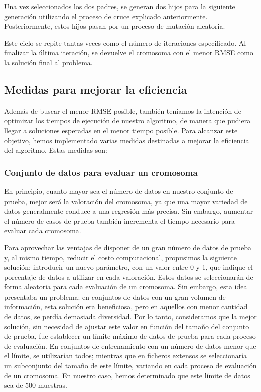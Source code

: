 \documentclass[conference,a4paper]{IEEEtran}
\begin{document}
Una vez seleccionados los dos padres, se generan dos hijos para la siguiente generación utilizando el proceso de cruce explicado anteriormente. Posteriormente, estos hijos pasan por un proceso de mutación aleatoria. 

Este ciclo se repite tantas veces como el número de iteraciones especificado. Al finalizar la última iteración, se devuelve el cromosoma con el menor RMSE como la solución final al problema.


\subsection{Medidas para mejorar la eficiencia}
Además de buscar el menor RMSE posible, también teníamos la intención de optimizar los tiempos de ejecución de nuestro algoritmo, de manera que pudiera llegar a soluciones esperadas en el menor tiempo posible. Para alcanzar este objetivo, hemos implementado varias medidas destinadas a mejorar la eficiencia del algoritmo. Estas medidas son:

\subsubsection{Conjunto de datos para evaluar un cromosoma}

En principio, cuanto mayor sea el número de datos en nuestro conjunto de prueba, mejor será la valoración del cromosoma, ya que una mayor variedad de datos generalmente conduce a una regresión más precisa. Sin embargo, aumentar el número de casos de prueba también incrementa el tiempo necesario para evaluar cada cromosoma.

Para aprovechar las ventajas de disponer de un gran número de datos de prueba y, al mismo tiempo, reducir el costo computacional, propusimos la siguiente solución: introducir un nuevo parámetro, con un valor entre 0 y 1, que indique el porcentaje de datos a utilizar en cada valoración. Estos datos se seleccionarán de forma aleatoria para cada evaluación de un cromosoma. Sin embargo, esta idea presentaba un problema: en conjuntos de datos con un gran volumen de información, esta solución era beneficiosa, pero en aquellos con menor cantidad de datos, se perdía demasiada diversidad. Por lo tanto, consideramos que la mejor solución, sin necesidad de ajustar este valor en función del tamaño del conjunto de prueba, fue establecer un límite máximo de datos de prueba para cada proceso de evaluación. En conjuntos de entrenamiento con un número de datos menor que el límite, se utilizarían todos; mientras que en ficheros extensos se seleccionaría un subconjunto del tamaño de este límite, variando en cada proceso de evaluación de un cromosoma. En nuestro caso, hemos determinado que este límite de datos sea de 500 muestras.
\end{document}
